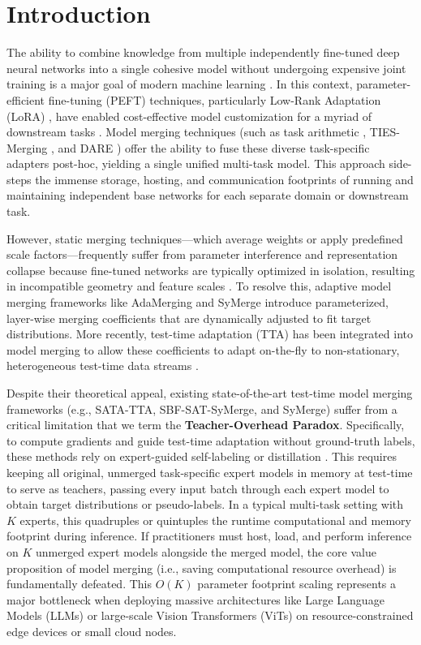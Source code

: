 \documentclass{article}
\theoremstyle{plain}
\theoremstyle{definition}
\theoremstyle{remark}
\begin{document}
\section{Introduction}
\label{sec:intro}

The ability to combine knowledge from multiple independently fine-tuned deep neural networks into a single cohesive model without undergoing expensive joint training is a major goal of modern machine learning \cite{wortsman2022model, matena2022merging}. In this context, parameter-efficient fine-tuning (PEFT) techniques, particularly Low-Rank Adaptation (LoRA) \cite{hu2021lora}, have enabled cost-effective model customization for a myriad of downstream tasks \cite{liu2022few, chavan2023one}. Model merging techniques (such as task arithmetic \cite{ilharco2022editing}, TIES-Merging \cite{yadav2023ties}, and DARE \cite{yu2024dare}) offer the ability to fuse these diverse task-specific adapters post-hoc, yielding a single unified multi-task model. This approach side-steps the immense storage, hosting, and communication footprints of running and maintaining independent base networks for each separate domain or downstream task.

However, static merging techniques—which average weights or apply predefined scale factors—frequently suffer from parameter interference and representation collapse because fine-tuned networks are typically optimized in isolation, resulting in incompatible geometry and feature scales \cite{jung2025symerge, yadav2023ties}. To resolve this, adaptive model merging frameworks like AdaMerging \cite{yang2024adamerging} and SyMerge \cite{jung2025symerge} introduce parameterized, layer-wise merging coefficients that are dynamically adjusted to fit target distributions. More recently, test-time adaptation (TTA) has been integrated into model merging to allow these coefficients to adapt on-the-fly to non-stationary, heterogeneous test-time data streams \cite{lee2025continual, dobler2022robust, song2023ecotta}.

Despite their theoretical appeal, existing state-of-the-art test-time model merging frameworks (e.g., SATA-TTA, SBF-SAT-SyMerge, and SyMerge) suffer from a critical limitation that we term the \textbf{Teacher-Overhead Paradox}. Specifically, to compute gradients and guide test-time adaptation without ground-truth labels, these methods rely on expert-guided self-labeling or distillation \cite{jin2024fine}. This requires keeping all original, unmerged task-specific expert models in memory at test-time to serve as teachers, passing every input batch through each expert model to obtain target distributions or pseudo-labels. In a typical multi-task setting with $K$ experts, this quadruples or quintuples the runtime computational and memory footprint during inference. If practitioners must host, load, and perform inference on $K$ unmerged expert models alongside the merged model, the core value proposition of model merging (i.e., saving computational resource overhead) is fundamentally defeated. This $O(K)$ parameter footprint scaling represents a major bottleneck when deploying massive architectures like Large Language Models (LLMs) or large-scale Vision Transformers (ViTs) on resource-constrained edge devices or small cloud nodes.
\end{document}
